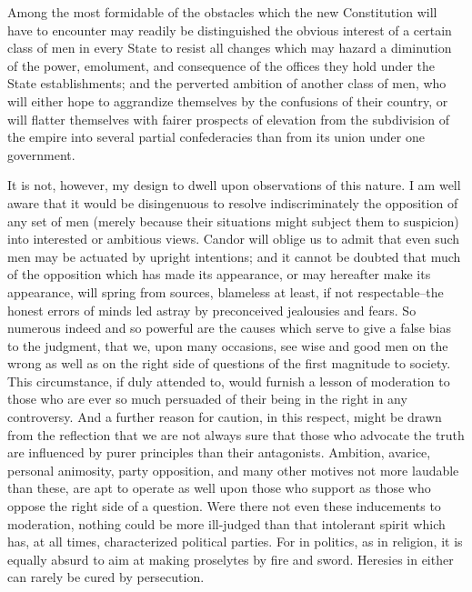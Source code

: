 Among the most formidable of the obstacles which the new
Constitution will have to encounter may readily be distinguished the
obvious interest of a certain class of men in every State to resist
all changes which may hazard a diminution of the power, emolument,
and consequence of the offices they hold under the State
establishments; and the perverted ambition of another class of men,
who will either hope to aggrandize themselves by the confusions of
their country, or will flatter themselves with fairer prospects of
elevation from the subdivision of the empire into several partial
confederacies than from its union under one government.

It is not, however, my design to dwell upon observations of this
nature. I am well aware that it would be disingenuous to resolve
indiscriminately the opposition of any set of men (merely because
their situations might subject them to suspicion) into interested or
ambitious views. Candor will oblige us to admit that even such men
may be actuated by upright intentions; and it cannot be doubted
that much of the opposition which has made its appearance, or may
hereafter make its appearance, will spring from sources, blameless
at least, if not respectable--the honest errors of minds led astray
by preconceived jealousies and fears. So numerous indeed and so
powerful are the causes which serve to give a false bias to the
judgment, that we, upon many occasions, see wise and good men on the
wrong as well as on the right side of questions of the first
magnitude to society. This circumstance, if duly attended to, would
furnish a lesson of moderation to those who are ever so much
persuaded of their being in the right in any controversy. And a
further reason for caution, in this respect, might be drawn from the
reflection that we are not always sure that those who advocate the
truth are influenced by purer principles than their antagonists.
Ambition, avarice, personal animosity, party opposition, and many
other motives not more laudable than these, are apt to operate as
well upon those who support as those who oppose the right side of a
question. Were there not even these inducements to moderation,
nothing could be more ill-judged than that intolerant spirit which
has, at all times, characterized political parties. For in
politics, as in religion, it is equally absurd to aim at making
proselytes by fire and sword. Heresies in either can rarely be
cured by persecution.

